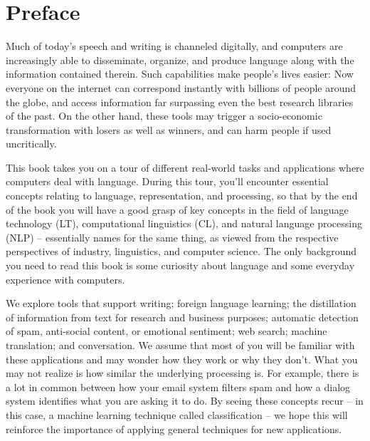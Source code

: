 \chapter{Preface}

\label{ch:preface}

Much of today's speech and writing is channeled digitally, and computers are increasingly able to disseminate, organize, and produce language along with the information contained therein.
  Such capabilities make people's lives easier: Now everyone on the internet can correspond instantly with billions of people around the globe, and  access information far surpassing even the best research
libraries of the past.   On the other hand, these  tools may trigger a socio-economic transformation with losers as well as winners, and can harm people if used uncritically.


This book takes you on a tour of different real-world tasks and
applications where computers deal with language.  
During this tour,
you'll encounter essential concepts relating to language, representation,
and processing, so that by the end of the book you will have a good
grasp of key concepts in the field of language technology (LT),  computational linguistics (CL), and natural language processing (NLP) -- essentially names for the same thing, as viewed from the respective perspectives of industry, linguistics, and computer science.  The
only background you need to read this book is some curiosity about
language and some everyday experience with computers.


We explore tools that support writing; foreign language learning; the distillation of information from text for research and business purposes; automatic detection of spam, anti-social content, or emotional sentiment; web search;  machine translation; and conversation.  We assume that most of you will be familiar with 
these applications and may wonder how they work or why they don't.  What
you may not realize is how similar the underlying processing is.  For
example, there is a lot in common between how your email system filters spam and how a dialog system identifies what you are asking it to do.  By seeing these concepts recur --
in this case, a machine learning technique called classification -- we hope this will
reinforce the importance of applying general techniques for new
applications. %


